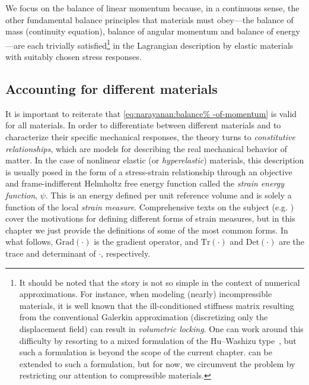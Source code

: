 We focus on the balance of linear momentum because, in a continuous
sense, the other fundamental balance principles that materials must
obey---the balance of mass (continuity equation), balance of angular
momentum and balance of energy---are each trivially
satisfied\footnote{It should be noted that the story is not
  so simple in the context of numerical approximations. For instance,
  when modeling (nearly) incompressible materials, it is well known
  that the ill-conditioned stiffness matrix resulting from the
  conventional Galerkin approximation (discretizing only the
  displacement field) can result in {\em volumetric locking}. One can
  work around this difficulty by resorting to a mixed formulation of
  the Hu--Washizu type~\citep{SimoHughes1998}, but such a formulation
  is beyond the scope of the current chapter. \twist{} can be extended
  to such a formulation, but for now, we circumvent the problem by
  restricting our attention to compressible materials.} in the
Lagrangian description by elastic materials with suitably chosen
stress responses.

\subsection{Accounting for different materials}

It is important to reiterate that \eqref{eq:narayanan:balance%
-of-momentum} is valid for all materials. In order to differentiate
between different materials and to characterize their specific
mechanical responses, the theory turns to {\em constitutive
relationships}, which are models for describing the real mechanical
behavior of matter. In the case of nonlinear elastic (or {\em
hyperelastic}) materials, this description is usually posed in the
form of a stress-strain relationship through an objective and
frame-indifferent Helmholtz free energy function called the {\em
strain energy function}, $\psi$. This is an energy defined per unit
reference volume and is solely a function of the local {\em strain
measure}. Comprehensive texts on the subject
(e.g. \citet{Holzapfel2000}) cover the motivations for defining
different forms of strain measures, but in this chapter we just
provide the definitions of some of the most common forms. In what
follows, $\mathrm{Grad}(\cdot)$ is the gradient operator, and
$\mathrm{Tr}(\cdot)$ and $\mathrm{Det}(\cdot)$ are the trace and
determinant of $\cdot$, respectively.

